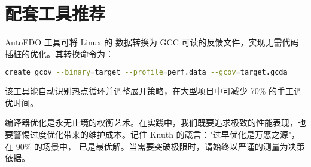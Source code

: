 \section{配套工具推荐}
AutoFDO 工具可将 Linux 的  数据转换为 GCC 可读的反馈文件，实现无需代码插桩的优化。其转换命令为：\par
\begin{lstlisting}[language=bash]
create_gcov --binary=target --profile=perf.data --gcov=target.gcda
\end{lstlisting}
该工具能自动识别热点循环并调整展开策略，在大型项目中可减少 70\%{} 的手工调优时间。\par
编译器优化是永无止境的权衡艺术。在实践中，我们既要追求极致的性能表现，也要警惕过度优化带来的维护成本。记住 Knuth 的箴言："过早优化是万恶之源"，在 90\%{} 的场景中， 已是最优解。当需要突破极限时，请始终以严谨的测量为决策依据。\par
